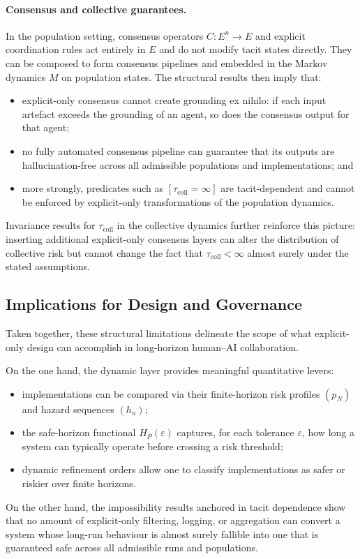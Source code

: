 \paragraph{Consensus and collective guarantees.}
In the population setting, consensus operators $C : E^n \to E$ and explicit coordination rules act entirely in $E$ and do not modify tacit states directly. They can be composed to form consensus pipelines and embedded in the Markov dynamics $M$ on population states. The structural results then imply that:
\begin{itemize}
  \item explicit-only consensus cannot create grounding ex nihilo: if each input artefact exceeds the grounding of an agent, so does the consensus output for that agent;
  \item no fully automated consensus pipeline can guarantee that its outputs are hallucination-free across all admissible populations and implementations; and
  \item more strongly, predicates such as $[\tau_{\mathrm{coll}} = \infty]$ are tacit-dependent and cannot be enforced by explicit-only transformations of the population dynamics.
\end{itemize}
Invariance results for $\tau_{\mathrm{coll}}$ in the collective dynamics further reinforce this picture: inserting additional explicit-only consensus layers can alter the distribution of collective risk but cannot change the fact that $\tau_{\mathrm{coll}} < \infty$ almost surely under the stated assumptions.

\subsection{Implications for Design and Governance}

Taken together, these structural limitations delineate the scope of what explicit-only design can accomplish in long-horizon human--AI collaboration.

On the one hand, the dynamic layer provides meaningful quantitative levers:
\begin{itemize}
  \item implementations can be compared via their finite-horizon risk profiles $(p_N)$ and hazard sequences $(h_n)$;
  \item the safe-horizon functional $H_P(\varepsilon)$ captures, for each tolerance $\varepsilon$, how long a system can typically operate before crossing a risk threshold;
  \item dynamic refinement orders allow one to classify implementations as safer or riskier over finite horizons.
\end{itemize}
On the other hand, the impossibility results anchored in tacit dependence show that no amount of explicit-only filtering, logging, or aggregation can convert a system whose long-run behaviour is almost surely fallible into one that is guaranteed safe across all admissible runs and populations.

